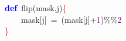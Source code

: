 \noindent
\mbox{}\textbf{\textcolor{Blue}{def}}\ flip\textcolor{BrickRed}{(}mask\textcolor{BrickRed}{,}j\textcolor{BrickRed}{)}\textcolor{Red}{\{} \\
\mbox{}\ \ \ \ mask\textcolor{BrickRed}{[}j\textcolor{BrickRed}{]}\ \textcolor{BrickRed}{=}\ \textcolor{BrickRed}{(}mask\textcolor{BrickRed}{[}j\textcolor{BrickRed}{]+}\textcolor{Purple}{1}\textcolor{BrickRed}{)\%\%}\textcolor{Purple}{2} \\
\mbox{}\textcolor{Red}{\}} \\
\mbox{}
